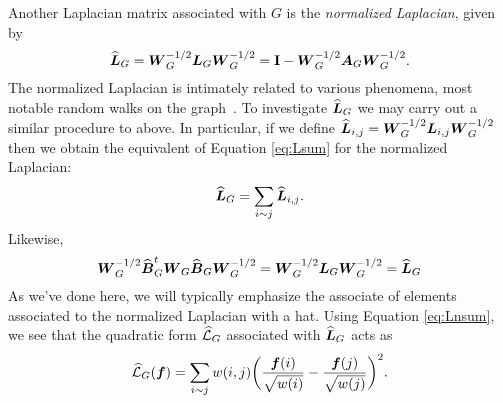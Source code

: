 Another Laplacian matrix associated with $G$ is the \emph{normalized Laplacian}, given by 
\begin{equation}
\label{eq:Ln_G}
    \widehat{\vb*{L}}_G = \vb*{W}_G^{-1/2} \vb*{L}_G\vb*{W}_G^{-1/2} = \vb{I} - \vb*{W}_G^{-1/2} \vb*{A}_G\vb*{W}_{G}^{-1/2}.
\end{equation} 
The normalized Laplacian is intimately related to various  phenomena, most notable random walks on the graph~\cite{chen2007resistance,chung1997spectral}. To investigate $\widehat{\vb*{L}}_G$ we may carry out a similar procedure to above. In particular, if we define $\widehat{\vb*{L}}_{i,j}=\vb*{W}_G^{-1/2} \vb*{L}_{i,j}\vb*{W}_G^{-1/2}$ then we obtain the equivalent of Equation \ref{eq:Lsum} for the normalized Laplacian:
\begin{equation}
\label{eq:Lnsum}
    \widehat{\vb*{L}}_G = \sum_{i\sim j}\widehat{\vb*{L}}_{i,j}.
\end{equation}
Likewise, 
\begin{equation*}
   \vb*{W}_G^{-1/2}\widehat{\vb*{B}}_G^t \vb*{W}_G\widehat{\vb*{B}}_G\vb*{W}_G^{-1/2} =  \vb*{W}_G^{-1/2}\vb*{L}_G\vb*{W}_G^{-1/2}=\widehat{\vb*{L}}_G
\end{equation*}
As we've done here, we will typically emphasize the associate of elements associated to the normalized Laplacian with a hat.
Using Equation \eqref{eq:Lnsum}, we see that 
the quadratic form $\widehat{\mathcal{L}}_G$ associated with $\widehat{\vb*{L}}_G$ acts as 
\begin{equation}
\label{eq:Lnf}
    \widehat{\mathcal{L}}_G(\vb*{f}) = \sum_{i\sim j} w(i,j)\bigg(\frac{\vb*{f}(i)}{\sqrt{w(i)}}-\frac{\vb*{f}(j)}{\sqrt{w(j)}}\bigg)^2.
\end{equation}




